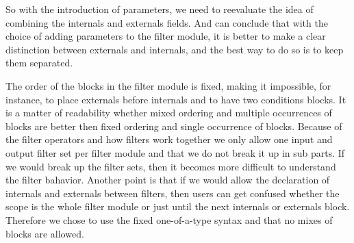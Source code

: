 So with the introduction of parameters, we need to reevaluate the idea of combining the internals and externals fields.
And can conclude that with the choice of adding parameters to the filter module, it is better to make a clear distinction between externals and internals, and the best way to do so is to keep them separated.

The order of the blocks in the filter module is fixed, making it impossible, for instance, to place externals before internals and to have two conditions blocks. 
It is a matter of readability whether mixed ordering and multiple occurrences of blocks are better then fixed ordering and single occurrence of blocks.
Because of the filter operators and how filters work together we only allow one input and output filter set per filter module and that we do not break it up in sub parts. 
If we would break up the filter sets, then it becomes more difficult to understand the filter bahavior.
Another point is that if we would allow the declaration of internals and externals between filters, then users can get confused whether the scope is the whole filter module or just until the next internals or externals block.
Therefore we chose to use the fixed one-of-a-type syntax and that no mixes of blocks are allowed.
